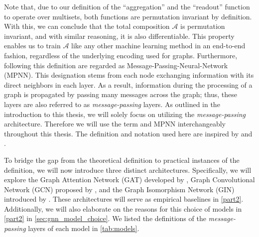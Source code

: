 Note that, due to our definition of the ``aggregation'' and the ``readout'' function to operate over multisets, both functions are permutation invariant by definition. With this, we can conclude that the total composition $\mathcal{A}$ is permutation invariant, and with similar reasoning, it is also differentiable. This property enables us to train $\mathcal{A}$ like any other machine learning method in an end-to-end fashion, regardless of the underlying encoding used for graphs. Furthermore, \gnns following this definition are regarded as \textsf{Message-Passing-Neural-Network (MPNN)}. This designation stems from each node exchanging information with its direct neighbors in each layer. As a result, information during the processing of a graph is propagated by passing many messages across the graph; thus, these layers are also referred to as \textit{message-passing} layers. As outlined in the introduction to this thesis, we will solely focus on \gnns utilizing the \textit{message-passing} architecture. Therefore we will use the term \gnn and \textsf{MPNN} interchangeably throughout this thesis. The definition and notation used here are inspired by \cite{Morris2018} and \cite{Xu2018}.

To bridge the gap from the theoretical definition to practical instances of the definition, we will now introduce three distinct \gnn architectures. Specifically, we will explore the \textsf{Graph Attention Network (GAT)} developed by \cite{Velivckovic2017}, \textsf{Graph Convolutional Network (GCN)} proposed by \cite{Kip+2017}, and the \textsf{Graph Isomorphism Network (GIN)} introduced by \cite{Xu2018}. These architectures will serve as empirical baselines in \cref{part2}. Additionally, we will also elaborate on the reasons for this choice of models in \cref{part2} in \cref{sec:gnn_model_choice}. We listed the definitions of the \textit{message-passing} layers of each model in \cref{tab:models}.

